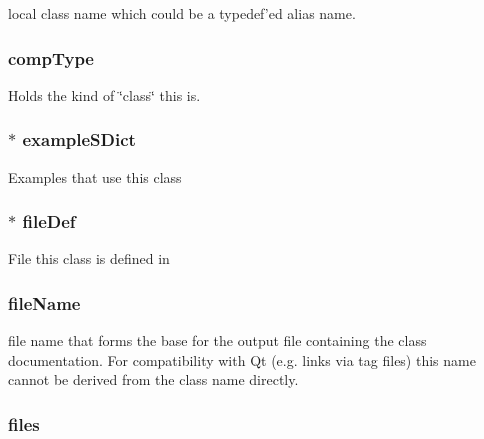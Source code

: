 local class name which could be a typedef'ed alias name. \hypertarget{class_class_def_impl_a78b7fb1883960e1a8935c4254e2de05b}{
\subsubsection[{comp\-Type}]{ comp\-Type}}\label{class_class_def_impl_a78b7fb1883960e1a8935c4254e2de05b}
Holds the kind of \char`\"{}class\char`\"{} this is. \hypertarget{class_class_def_impl_a7726dc36df5baed8960272489b15e599}{
\subsubsection[{example\-S\-Dict}]{$\ast$ example\-S\-Dict}}\label{class_class_def_impl_a7726dc36df5baed8960272489b15e599}
Examples that use this class \hypertarget{class_class_def_impl_a2e1ae363ea84baa4340319bb5a163f25}{
\subsubsection[{file\-Def}]{$\ast$ file\-Def}}\label{class_class_def_impl_a2e1ae363ea84baa4340319bb5a163f25}
File this class is defined in \hypertarget{class_class_def_impl_abb9cd3e430c4eaf05aa259fa96f32305}{
\subsubsection[{file\-Name}]{ file\-Name}}\label{class_class_def_impl_abb9cd3e430c4eaf05aa259fa96f32305}
file name that forms the base for the output file containing the class documentation. For compatibility with Qt (e.\-g. links via tag files) this name cannot be derived from the class name directly. \hypertarget{class_class_def_impl_adbfe1e3c296fd762e9e717e0e83358e2}{
\subsubsection[{files}]{ files}}\label{class_class_def_impl_adbfe1e3c296fd762e9e717e0e83358e2}
